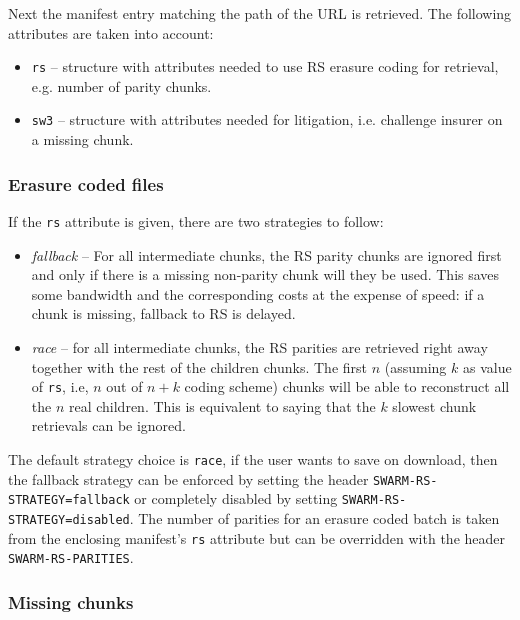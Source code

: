 Next the manifest entry matching the path of the URL is retrieved. The following attributes are taken into account:

\begin{itemize}[noitemsep]
    \item \lstinline{rs} -- {
    structure with attributes needed to use RS erasure coding for retrieval, e.g. number of parity chunks}.
    \item \lstinline{sw3} -- { structure with attributes needed for litigation, i.e. challenge insurer on a missing chunk}. 
\end{itemize}


\subsubsection{Erasure coded files}

If the \lstinline{rs} attribute is given, there are two strategies to follow: 

\begin{itemize}[noitemsep]
\item \emph{fallback} -- For all intermediate chunks, the RS parity chunks are ignored first and only if there is a missing non-parity chunk will they be used. This saves some bandwidth and the corresponding costs at the expense of speed: if a chunk is missing, fallback to RS is delayed.
\item \emph{race} -- for all intermediate chunks, the RS parities are retrieved right away together with the rest of the children chunks. The first $n$ (assuming $k$ as value of \lstinline{rs}, i.e, $n$ out of $n+k$ coding scheme) chunks will be able to reconstruct all the $n$ real children. This is equivalent to saying that the $k$ slowest chunk retrievals can be ignored.  
\end{itemize}

The default strategy choice is \lstinline{race}, if the user wants to save on download, then the fallback strategy can be enforced by setting the header \lstinline{SWARM-RS-STRATEGY=fallback} or completely disabled by setting \lstinline{SWARM-RS-STRATEGY=disabled}. The number of parities for an erasure coded batch is taken from the enclosing manifest's \lstinline{rs} attribute but can be overridden with the header \lstinline{SWARM-RS-PARITIES}.

\subsubsection{Missing chunks}

